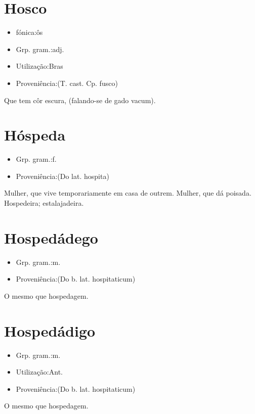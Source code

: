 \documentclass{article}
\begin{document}
\section{Hosco}
\begin{itemize}
\item {fónica:ôs}
\end{itemize}
\begin{itemize}
\item {Grp. gram.:adj.}
\end{itemize}
\begin{itemize}
\item {Utilização:Bras}
\end{itemize}
\begin{itemize}
\item {Proveniência:(T. cast. Cp. \textunderscore fusco\textunderscore )}
\end{itemize}
Que tem côr escura, (falando-se de gado vacum).
\section{Hóspeda}
\begin{itemize}
\item {Grp. gram.:f.}
\end{itemize}
\begin{itemize}
\item {Proveniência:(Do lat. \textunderscore hospita\textunderscore )}
\end{itemize}
Mulher, que vive temporariamente em casa de outrem.
Mulher, que dá poisada.
Hospedeira; estalajadeira.
\section{Hospedádego}
\begin{itemize}
\item {Grp. gram.:m.}
\end{itemize}
\begin{itemize}
\item {Proveniência:(Do b. lat. \textunderscore hospitaticum\textunderscore )}
\end{itemize}
O mesmo que \textunderscore hospedagem\textunderscore .
\section{Hospedádigo}
\begin{itemize}
\item {Grp. gram.:m.}
\end{itemize}
\begin{itemize}
\item {Utilização:Ant.}
\end{itemize}
\begin{itemize}
\item {Proveniência:(Do b. lat. \textunderscore hospitaticum\textunderscore )}
\end{itemize}
O mesmo que \textunderscore hospedagem\textunderscore .
\end{document}
